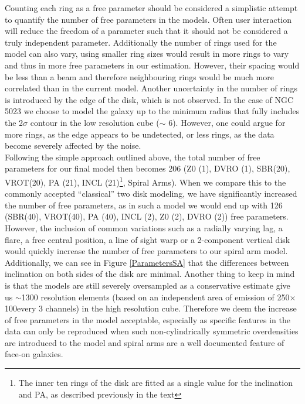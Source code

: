 \documentclass[useAMS,usenatbib]{mn2e}
\begin{document}
\indent Counting each ring as a free parameter should be considered a simplistic attempt to quantify the number of free parameters in the models. Often user interaction will reduce the freedom of a parameter  such that it should not be considered a truly independent parameter. Additionally the number of rings used for the model can also vary, using smaller ring sizes would result in more rings to vary and thus in more free parameters in our estimation. However, their spacing would be less than a beam and therefore neighbouring rings would be much more correlated than in the current model. Another uncertainty in the number of rings is introduced by the edge of the disk, which is not observed. In the case of NGC 5023 we choose to model the galaxy up to the minimum radius that fully includes the 2$\sigma$ contour in the low resolution cube ($\sim$ 6\arcmin). However, one could argue for more rings, as the edge appears to be undetected, or less rings, as the data become severely affected by the noise.\\
\indent Following the simple approach outlined above, the total number of free parameters for our final model then becomes 206 (Z0 (1), DVRO (1), SBR(20), VROT(20), PA (21), INCL (21)\footnote{The inner ten rings of the disk are fitted as a single value  for the inclination and PA, as described previously in the text}, Spiral Arms). When we compare this to the commonly accepted ``classical''  two disk modeling, we have significantly increased the number of free parameters, as in such a model we would end up with 126 (SBR(40), VROT(40), PA (40), INCL (2), Z0 (2), DVRO (2)) free parameters.  However, the inclusion of common variations such as a radially varying lag, a flare, a free central position, a line of sight warp  or a  2-component vertical disk  would quickly increase the number of free parameters to our spiral arm model. Additionally, we can see in Figure \ref{ParametersSA} that the differences between inclination on both sides of the disk are minimal. Another thing to keep in mind is that the models are still severely oversampled as a conservative estimate give us $\sim$1300 resolution elements (based on an independent area of emission of 250\arcsec$\times$100\arcsec every 3 channels) in the high resolution cube. Therefore we deem the increase of free parameters in the model acceptable, especially as specific features in the data can only be reproduced when such non-cylindrically symmetric overdensities are introduced to the model and  spiral arms are a well documented feature of face-on galaxies.\\
\end{document}
